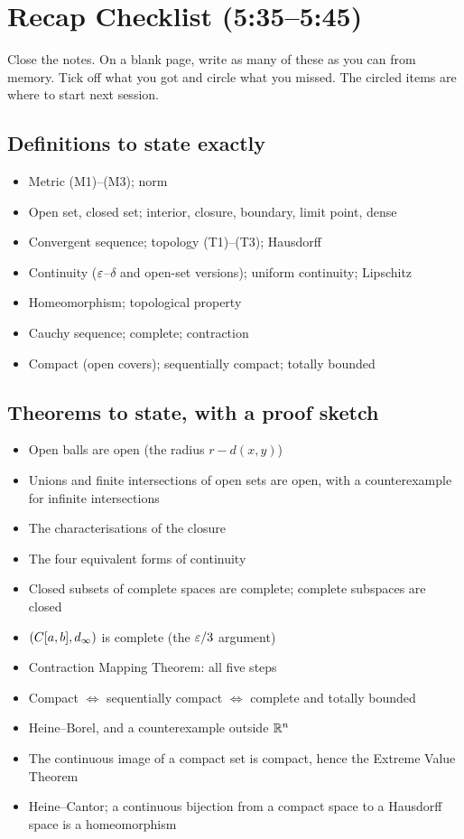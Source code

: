 \chapter{Recap Checklist (5:35--5:45)}\label{app:recap}
Close the notes. On a blank page, write as many of these as you can from memory. Tick off what you got and circle what you missed. The circled items are where to start next session.

\section*{Definitions to state exactly}
\begin{itemize}[label=$\square$]
\iffull
  \item Metric \textup{(M1)--(M3)}; norm
  \item Open set, closed set; interior, closure, boundary, limit point, dense
  \item Convergent sequence; topology \textup{(T1)--(T3)}; Hausdorff
\fi
  \item Continuity ($\varepsilon$--$\delta$ and open-set versions); uniform continuity; Lipschitz
  \item Homeomorphism; topological property
  \item Cauchy sequence; complete; contraction
  \item Compact (open covers); sequentially compact; totally bounded
\end{itemize}

\section*{Theorems to state, with a proof sketch}
\begin{itemize}[label=$\square$]
\iffull
  \item Open balls are open (the radius $r-d(x,y)$)
  \item Unions and finite intersections of open sets are open, with a counterexample for infinite intersections
  \item The characterisations of the closure
\fi
  \item The four equivalent forms of continuity
  \item Closed subsets of complete spaces are complete; complete subspaces are closed
  \item $(C[a,b],d_\infty)$ is complete (the $\varepsilon/3$ argument)
  \item Contraction Mapping Theorem: all five steps
  \item Compact $\iff$ sequentially compact $\iff$ complete and totally bounded
  \item Heine--Borel, and a counterexample outside $\mathbb{R}^n$
  \item The continuous image of a compact set is compact, hence the Extreme Value Theorem
  \item Heine--Cantor; a continuous bijection from a compact space to a Hausdorff space is a homeomorphism
\end{itemize}

